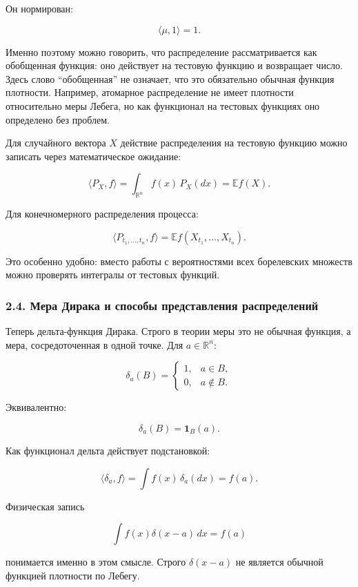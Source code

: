\documentclass[
  11pt,
  a4paper,
]{article}
\begin{document}
Он нормирован:

\[
\langle\mu,1\rangle=1.
\]

Именно поэтому можно говорить, что распределение рассматривается как
обобщенная функция: оно действует на тестовую функцию и возвращает
число. Здесь слово ``обобщенная'' не означает, что это обязательно
обычная функция плотности. Например, атомарное распределение не имеет
плотности относительно меры Лебега, но как функционал на тестовых
функциях оно определено без проблем.

Для случайного вектора \(X\) действие распределения на тестовую функцию
можно записать через математическое ожидание:

\[
\langle P_X,f\rangle
=
\int_{\mathbb R^n}f(x)\,P_X(dx)
=
\mathbb E f(X).
\]

Для конечномерного распределения процесса:

\[
\langle P_{t_1,\ldots,t_n},f\rangle
=
\mathbb E f(X_{t_1},\ldots,X_{t_n}).
\]

Это особенно удобно: вместо работы с вероятностями всех борелевских
множеств можно проверять интегралы от тестовых функций.

\subsubsection{2.4. Мера Дирака и способы представления
распределений}\label{ux43cux435ux440ux430-ux434ux438ux440ux430ux43aux430-ux438-ux441ux43fux43eux441ux43eux431ux44b-ux43fux440ux435ux434ux441ux442ux430ux432ux43bux435ux43dux438ux44f-ux440ux430ux441ux43fux440ux435ux434ux435ux43bux435ux43dux438ux439}

Теперь дельта-функция Дирака. Строго в теории меры это не обычная
функция, а мера, сосредоточенная в одной точке. Для \(a\in\mathbb R^n\):

\[
\delta_a(B)=
\begin{cases}
1, & a\in B,\\
0, & a\notin B.
\end{cases}
\]

Эквивалентно:

\[
\delta_a(B)=\mathbf 1_B(a).
\]

Как функционал дельта действует подстановкой:

\[
\langle\delta_a,f\rangle
=
\int f(x)\,\delta_a(dx)
=
f(a).
\]

Физическая запись

\[
\int f(x)\delta(x-a)\,dx=f(a)
\]

понимается именно в этом смысле. Строго \(\delta(x-a)\) не является
обычной функцией плотности по Лебегу.
\end{document}

